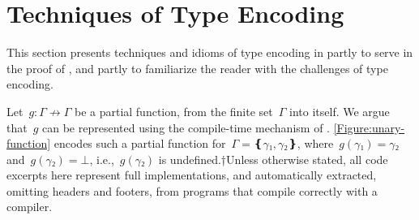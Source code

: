 \documentclass[a4paper,USenglish]{lipics-v2016}
\def\ReplaceInThesis#1#2{#1}
\begin{document}
\section{Techniques of Type Encoding}
\label{section:toolkit}
This section presents techniques and idioms of type encoding in \Java 
  partly to serve in the proof of , 
  and partly to familiarize the reader with 
  the challenges of type encoding. 

Let~$g:Γ↛Γ$ be a partial function,
  from the finite set~$Γ$ into itself.
We argue that~$g$ can
  be represented using the compile-time mechanism of \Java.
  \cref{Figure:unary-function\ReplaceInThesis{}{-b}} encodes such a partial function for~$Γ=❴γ₁,γ₂❵$, where~$g(γ₁)=γ₂$
  and~$g(γ₂)=⊥$, i.e.,~$g(γ₂)$ is undefined.†{Unless otherwise stated,
      all code excerpts here represent full implementations,
      and automatically extracted, omitting headers and footers,
    from \Java programs that compile correctly with a  compiler.}
\end{document}

